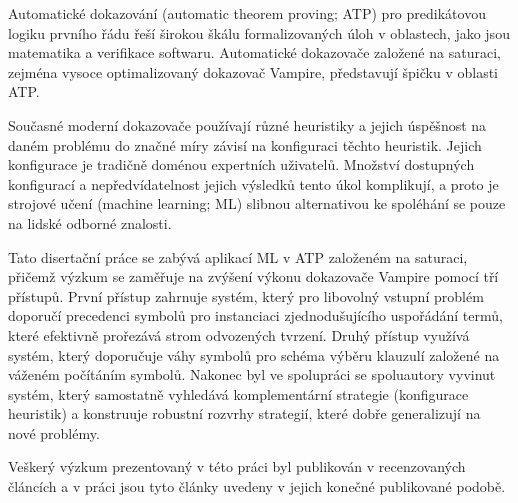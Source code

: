 Automatické dokazování (automatic theorem proving; ATP) pro predikátovou logiku prvního řádu řeší širokou škálu formalizovaných úloh v oblastech, jako jsou matematika a verifikace softwaru. Automatické dokazovače založené na saturaci, zejména vysoce optimalizovaný dokazovač Vampire, představují špičku v oblasti ATP.

Současné moderní dokazovače používají různé heuristiky a jejich úspěšnost na daném problému do značné míry závisí na konfiguraci těchto heuristik. Jejich konfigurace je tradičně doménou expertních uživatelů. Množství dostupných konfigurací a nepředvídatelnost jejich výsledků tento úkol komplikují, a proto je strojové učení (machine learning; ML) slibnou alternativou ke spoléhání se pouze na lidské odborné znalosti.

Tato disertační práce se zabývá aplikací ML v ATP založeném na saturaci, přičemž výzkum se zaměřuje na zvýšení výkonu dokazovače Vampire pomocí tří přístupů. První přístup zahrnuje systém, který pro libovolný vstupní problém doporučí precedenci symbolů pro instanciaci zjednodušujícího uspořádání termů, které efektivně prořezává strom odvozených tvrzení. Druhý přístup využívá systém, který doporučuje váhy symbolů pro schéma výběru klauzulí založené na váženém počítáním symbolů. Nakonec byl ve spolupráci se spoluautory vyvinut systém, který samostatně vyhledává komplementární strategie (konfigurace heuristik) a konstruuje robustní rozvrhy strategií, které dobře generalizují na nové problémy.

Veškerý výzkum prezentovaný v této práci byl publikován v recenzovaných článcích a v práci jsou tyto články uvedeny v jejich konečné publikované podobě.

